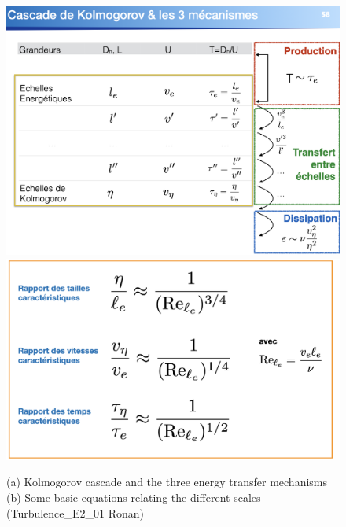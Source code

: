 \documentclass[a4paper,11pt]{article}
\begin{document}
\begin{figure}[ht!]
	\centering
	\includegraphics[width=.96\linewidth]{figures/cascade.png}
	\vspace{10pt}\\
	\includegraphics[width=.96\linewidth]{figures/relations.png}
	\caption{(a) Kolmogorov cascade and the three energy transfer mechanisms (b) Some basic equations relating the different scales (Turbulence\_E2\_01 Ronan)}
\end{figure}
\end{document}
